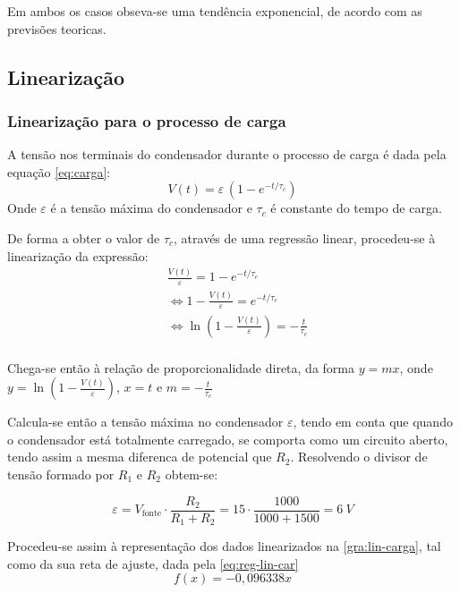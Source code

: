 Em ambos os casos obseva-se uma tendência exponencial, de acordo com as previsões teoricas.


\subsection{Linearização}
\subsubsection{Linearização para o processo de carga}

A tensão nos terminais do condensador durante o processo de carga é dada pela equação \cref{eq:carga}:
\begin{equation} \label{eq:carga}
	V(t) = \varepsilon\, (1 - e^{-t/\tau_c})
\end{equation}
Onde $\varepsilon$ é a tensão máxima do condensador e $\tau_c$ é constante do tempo de carga.

De forma a obter o valor de $\tau_c$, através de uma regressão linear, procedeu-se à linearização da expressão:
\begin{align*}
	 & \frac{V(t)}{\varepsilon} = 1 - e^{-t/\tau_c}                                      \\
	 & \Leftrightarrow 1 - \frac{V(t)}{\varepsilon} = e^{-t/\tau_c}                      \\
	 & \Leftrightarrow \ln\left(1 - \frac{V(t)}{\varepsilon}\right) = - \frac{t}{\tau_c} \\
\end{align*}

Chega-se então à relação de proporcionalidade direta, da forma $y = mx$, onde $y = \ln\left(1 - \frac{V(t)}{\varepsilon}\right)$, $x = t$ e $m = -\frac{t}{\tau_c}$

Calcula-se então a tensão máxima no condensador $\varepsilon$, tendo em conta que quando o condensador está totalmente carregado, se comporta como um circuito aberto, tendo assim a mesma diferenca de potencial que $R_2$. Resolvendo o divisor de tensão formado por $R_1$ e $R_2$ obtem-se:

\begin{equation*}
	\varepsilon = V_\text{fonte} \cdot \frac{R_2}{R_1 + R_2} = 15 \cdot \frac{1000}{1000 + 1500} = \qty{6}{V}
\end{equation*}

Procedeu-se assim à representação dos dados linearizados na \cref{gra:lin-carga}, tal como da sua reta de ajuste, dada pela \cref{eq:reg-lin-car}
\begin{equation} \label{eq:reg-lin-car}
	f(x) = -0,096338 x
\end{equation}

